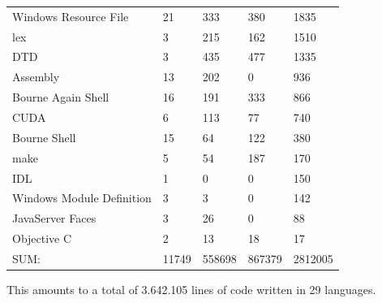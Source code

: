 \begin{table}[h]
\begin{tabular}{ l|l|l|l|l }
		Windows Resource File                 &  21         &   333         &   380        &   1835\\
		lex                                   &   3         &   215         &   162        &   1510\\
		DTD                                   &   3         &   435         &   477        &   1335\\
		Assembly                              &  13         &   202         &     0        &    936\\
		Bourne Again Shell                    &  16         &   191         &   333        &    866\\
		CUDA                                  &   6         &   113         &    77        &    740\\
		Bourne Shell                          &  15         &    64         &   122        &    380\\
		make                                  &   5         &    54         &   187        &    170\\
		IDL                                   &   1         &     0         &     0        &    150\\
		Windows Module Definition             &   3         &     3         &     0        &    142\\
		JavaServer Faces                      &   3         &    26         &     0        &     88\\
		Objective C                           &   2         &    13         &    18        &     17\\
		\hline
		SUM:                                 &11749         &558698         &867379        &2812005\\
		\hline
	\end{tabular}
    \normalfont
    \label{table:VTKStatistic}
\end{table}

This amounts to a total of 3.642.105 lines of code written in 29 languages.
